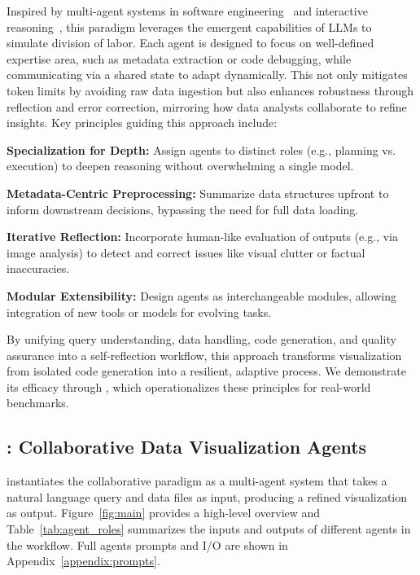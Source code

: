 Inspired by multi-agent systems in software engineering~\citep{Yang2024SWEagentAI} and interactive reasoning~\citep{Yao2022ReActSR}, this paradigm leverages the emergent capabilities of LLMs to simulate division of labor. Each agent is designed to focus on well-defined expertise area, such as metadata extraction or code debugging, while communicating via a shared state to adapt dynamically. This not only mitigates token limits by avoiding raw data ingestion but also enhances robustness through reflection and error correction, mirroring how data analysts collaborate to refine insights.
Key principles guiding this approach include:

\textbf{\textcolor{StarIndigo}{Specialization for Depth:}} Assign agents to distinct roles (e.g., planning vs. execution) to deepen reasoning without overwhelming a single model.

\textbf{\textcolor{StarIndigo}{Metadata-Centric Preprocessing:}} Summarize data structures upfront to inform downstream decisions, bypassing the need for full data loading.

\textbf{\textcolor{StarIndigo}{Iterative Reflection:}} Incorporate human-like evaluation of outputs (e.g., via image analysis) to detect and correct issues like visual clutter or factual inaccuracies.

\textbf{\textcolor{StarIndigo}{Modular Extensibility:}} Design agents as interchangeable modules, allowing integration of new tools or models for evolving tasks.


By unifying query understanding, data handling, code generation, and quality assurance into a self-reflection workflow, this approach transforms visualization from isolated code generation into a resilient, adaptive process. We demonstrate its efficacy through \methodname{}, which operationalizes these principles for real-world benchmarks.

\subsection{\methodname{}: Collaborative Data Visualization Agents}

\methodname{} instantiates the collaborative paradigm as a multi-agent system that takes a natural language query and data files as input, producing a refined visualization as output. Figure~\ref{fig:main} provides a high-level overview and Table~\ref{tab:agent_roles} summarizes the inputs and outputs of different agents in the workflow. 
Full agents prompts and I/O are shown in Appendix~\ref{appendix:prompts}.

